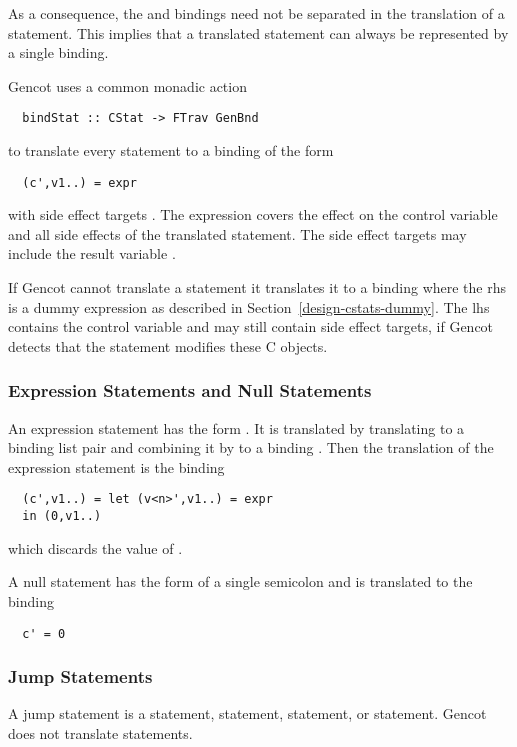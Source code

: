 As a consequence, the  and  bindings need not be separated in the translation of a statement.
This implies that a translated statement can always be represented by a single binding.

Gencot uses a common monadic action 
\begin{verbatim}
  bindStat :: CStat -> FTrav GenBnd
\end{verbatim}
to translate every statement to a binding of the form
\begin{verbatim}
  (c',v1..) = expr
\end{verbatim}
with side effect targets . The expression  covers the effect on the control variable and 
all side effects of the translated statement. The side effect targets may include the result variable .

If Gencot cannot translate a statement it translates it to a binding where the rhs is a dummy expression as described in 
Section~\ref{design-cstats-dummy}. The lhs contains the control variable and may still contain side effect targets, if 
Gencot detects that the statement modifies these C objects.

\subsubsection{Expression Statements and Null Statements}

An expression statement has the form . It is translated by translating  to a binding list pair and 
combining it by  to a binding . Then the translation of the expression statement
is the binding
\begin{verbatim}
  (c',v1..) = let (v<n>',v1..) = expr
  in (0,v1..)
\end{verbatim}
which discards the value  of .

A null statement has the form of a single semicolon \code{;} and is translated to the
binding
\begin{verbatim}
  c' = 0
\end{verbatim}

\subsubsection{Jump Statements}

A jump statement is a  statement,  statement,  statement, or  statement.
Gencot does not translate  statements.

